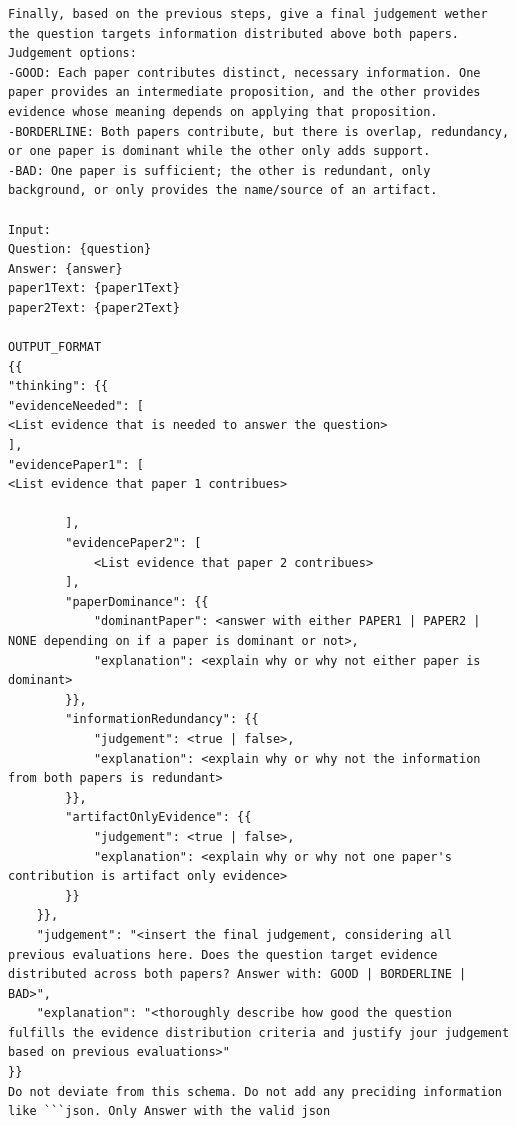 \begin{lstlisting}[caption={Evidence Distribution Prompt}, label={lst:EvidenceDistributionPrompt}]
Finally, based on the previous steps, give a final judgement wether the question targets information distributed above both papers.
Judgement options:
-GOOD: Each paper contributes distinct, necessary information. One paper provides an intermediate proposition, and the other provides evidence whose meaning depends on applying that proposition.
-BORDERLINE: Both papers contribute, but there is overlap, redundancy, or one paper is dominant while the other only adds support.
-BAD: One paper is sufficient; the other is redundant, only background, or only provides the name/source of an artifact.

Input:
Question: {question}
Answer: {answer}
paper1Text: {paper1Text}
paper2Text: {paper2Text}

OUTPUT_FORMAT
{{
"thinking": {{
"evidenceNeeded": [
<List evidence that is needed to answer the question>
],
"evidencePaper1": [
<List evidence that paper 1 contribues>

        ],
        "evidencePaper2": [
            <List evidence that paper 2 contribues>
        ],
        "paperDominance": {{
            "dominantPaper": <answer with either PAPER1 | PAPER2 | NONE depending on if a paper is dominant or not>,
            "explanation": <explain why or why not either paper is dominant>
        }},
        "informationRedundancy": {{
            "judgement": <true | false>,
            "explanation": <explain why or why not the information from both papers is redundant>
        }},
        "artifactOnlyEvidence": {{
            "judgement": <true | false>,
            "explanation": <explain why or why not one paper's contribution is artifact only evidence>
        }}
    }},
    "judgement": "<insert the final judgement, considering all previous evaluations here. Does the question target evidence distributed across both papers? Answer with: GOOD | BORDERLINE | BAD>",
    "explanation": "<thoroughly describe how good the question fulfills the evidence distribution criteria and justify jour judgement based on previous evaluations>"
}}
Do not deviate from this schema. Do not add any preciding information like ```json. Only Answer with the valid json


\end{lstlisting}


